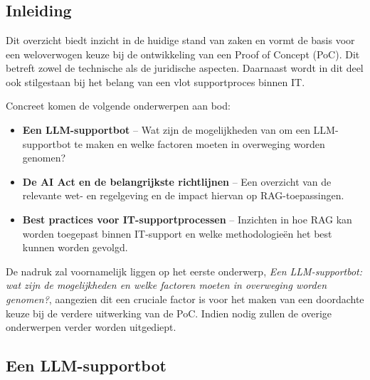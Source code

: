 \chapter{}%
\label{ch:stand-van-zaken}



\section{Inleiding}
Dit overzicht biedt inzicht in de huidige stand van zaken en vormt de basis voor een weloverwogen keuze bij de ontwikkeling van een Proof of Concept (PoC). Dit betreft zowel de technische als de juridische aspecten. Daarnaast wordt in dit deel ook stilgestaan bij het belang van een vlot supportproces binnen IT.

Concreet komen de volgende onderwerpen aan bod:
\begin{itemize}
    \item \textbf{Een LLM-supportbot} – Wat zijn de mogelijkheden van om een LLM-supportbot te maken en welke factoren moeten in overweging worden genomen?
    \item \textbf{De AI Act en de belangrijkste richtlijnen} – Een overzicht van de relevante wet- en regelgeving en de impact hiervan op RAG-toepassingen.
    \item \textbf{Best practices voor IT-supportprocessen} – Inzichten in hoe RAG kan worden toegepast binnen IT-support en welke methodologieën het best kunnen worden gevolgd.
\end{itemize}

De nadruk zal voornamelijk liggen op het eerste onderwerp, \textit{Een LLM-supportbot: wat zijn de mogelijkheden en welke factoren moeten in overweging worden genomen?}, aangezien dit een cruciale factor is voor het maken van een doordachte keuze bij de verdere uitwerking van de PoC. Indien nodig zullen de overige onderwerpen verder worden uitgediept.

\section{Een LLM-supportbot}

